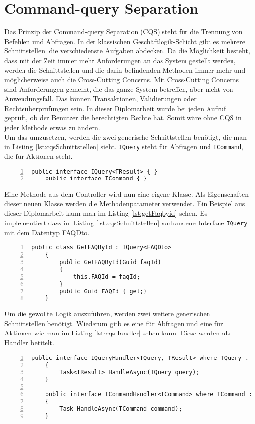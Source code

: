 \chapter{Command-query Separation}
Das Prinzip der Command-query Separation (CQS) steht für die Trennung von Befehlen und Abfragen. In der klassischen Geschäftlogik-Schicht gibt es mehrere Schnittstellen, die verschiedenste Aufgaben abdecken. Da die Möglichkeit besteht, dass  mit der Zeit immer mehr Anforderungen an das System gestellt werden, werden die Schnittstellen und die darin befindenden Methoden immer mehr und möglicherweise auch die Cross-Cutting Concerns. Mit Cross-Cutting Concerns sind Anforderungen gemeint, die das ganze System betreffen, aber nicht von Anwendungsfall. Das können Transaktionen, Validierungen oder Rechteüberprüfungen sein. In dieser Diplomarbeit wurde bei jeden Aufruf geprüft, ob der Benutzer die berechtigten Rechte hat. Somit wäre ohne CQS in jeder Methode etwas zu ändern. \autocite{cqsSOLIDeArchitektur}\\
Um das umzusetzen, werden die zwei generische Schnittstellen benötigt, die man in Listing \ref{lst:cqsSchnittstellen} sieht. \texttt{IQuery} steht für Abfragen und \texttt{ICommand}, die für Aktionen steht.
\begin{lstlisting}[caption={CQS-Schnittstellen},captionpos=b, numbers=left, backgroundcolor=\color{black!10},language={[Sharp]C}, label={lst:cqsSchnittstellen}]
	public interface IQuery<TResult> { }
	public interface ICommand { }
\end{lstlisting}
Eine Methode aus dem Controller wird nun eine eigene Klasse. Als Eigenschaften dieser neuen Klasse werden die Methodenparameter verwendet. Ein Beispiel aus dieser Diplomarbeit kann man im Listing \ref{lst:getFaqbyid} sehen. Es implementiert dass im Listing \ref{lst:cqsSchnittstellen} vorhandene Interface \texttt{IQuery} mit dem Datentyp FAQDto.
\begin{lstlisting}[caption={CQS-Query Beispiel},captionpos=b, numbers=left, backgroundcolor=\color{black!10},language={[Sharp]C}, label={lst:getFaqbyid}]
	public class GetFAQById : IQuery<FAQDto>
	{
		public GetFAQById(Guid faqId)
		{
			this.FAQId = faqId;
		}
		public Guid FAQId { get;}
	}
\end{lstlisting}
Um die gewollte Logik auszuführen, werden zwei weitere generischen Schnittstellen benötigt. Wiederum gitb es eine für Abfragen und eine für Aktionen wie man im Listing \ref{lst:cqsHandler} sehen kann. Diese werden als Handler betitelt. \autocite{cqsSOLIDeArchitektur}
\begin{lstlisting}[caption={CQS-Query Beispiel},captionpos=b, numbers=left, backgroundcolor=\color{black!10},language={[Sharp]C}, label={lst:cqsHandler}]
	public interface IQueryHandler<TQuery, TResult>	where TQuery : IQuery<TResult>
	{
		Task<TResult> HandleAsync(TQuery query);
	}
	
	public interface ICommandHandler<TCommand> where TCommand : ICommand
	{
		Task HandleAsync(TCommand command);
	}
\end{lstlisting}